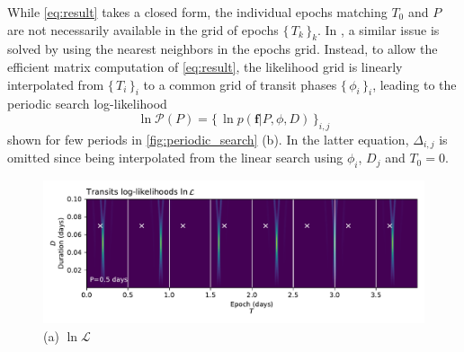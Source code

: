 \documentclass[modern]{aastex631}
\newcommand{\set}[1]{\{\,#1\,\}}
\begin{document}
While \autoref{eq:result} takes a closed form, the individual epochs matching $T_0$ and $P$ are not necessarily available in the grid of epochs $\set{T_k}_k$. In \cite{foreman2016}, a similar issue is solved by using the nearest neighbors in the epochs grid. Instead, to allow the efficient matrix computation of \autoref{eq:result}, the likelihood grid is linearly interpolated from $\set{T_i}_i$ to a common grid of transit phases $\set{\phi_i}_i$, leading to the periodic search log-likelihood
$$\ln\mathcal{P}(P) = \set{\ln p(\bm{f} \vert P, \phi, D)}_{i,j}$$
shown for few periods in \autoref{fig:periodic_search} (b). In the latter equation, $\Delta_{i,j}$ is omitted since being interpolated from the linear search using $\phi_i$, $D_j$ and $T_0 = 0$.

\begin{figure}[H]
    \centering
    \includegraphics[width=\linewidth]{../workflows/principle/figures/principle_periodic_0.pdf}\\
    {(a) $\ln \mathcal{L}$}
\end{figure}
\end{document}
